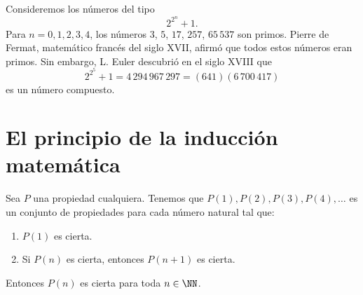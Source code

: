 \newpage

\begin{examplebox}{}{}
    Consideremos los números del tipo
    $$2^{2^n} + 1.$$
    Para $n = 0, 1, 2, 3, 4$, los números $3$, $5$, $17$, $257$, $65 \, 537$ son primos. Pierre de Fermat, matemático francés del siglo XVII, afirmó que todos estos números eran primos. Sin embargo, L. Euler descubrió en el siglo XVIII que
    $$2^{2^5} + 1 = 4 \, 294 \, 967 \, 297 = (641)(6 \, 700 \, 417)$$
    es un número compuesto.
\end{examplebox}

\section{El principio de la inducción matemática}

\begin{tcolorbox}[
    theorem style=change apart,
    enhanced,
    lower separated=false,
    breakable,
    boxrule=0pt,
    frame hidden,
    colback=black!7!white,
    coltitle=black,
    boxed title style={colframe=white, colback=white, boxrule=0pt},
    fontupper=\normalsize,
    before upper={\abovedisplayskip=8pt\belowdisplayskip=8pt},
    left=1mm,
    right=1mm,
    top=1mm,
    bottom=1mm,
    sharp corners,
    overlay={
        \node[left, font=\bfseries\color{black}\fontencoding{T1}\fontfamily{phv}\selectfont,minimum width=2cm, anchor=east, xshift=-0.5\marginparsep, yshift=-0.348cm] at (frame.north west) {Principio de Inducción:};
    }
]
    Sea $P$ una propiedad cualquiera. Tenemos que $P(1), P(2), P(3), P(4), \dots$ es un conjunto de propiedades para cada número natural tal que:
    \begin{enumerate}[label=\roman*., topsep=6pt, itemsep=0pt]
        \item $P(1)$ es cierta.
        \item Si $P(n)$ es cierta, entonces $P(n+1)$ es cierta.
    \end{enumerate}
    Entonces $P(n)$ es cierta para toda $n \in \NN$.
\end{tcolorbox}

